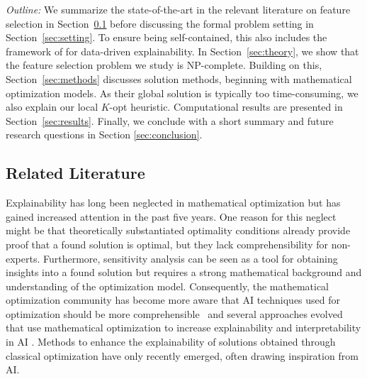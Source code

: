 \documentclass[11pt, a4paper]{article}
\newcommand{\MGil}[1]{\todo[color=gray, textcolor=black, inline, author=MG]{#1}}
\begin{document}
\emph{Outline:} We summarize the state-of-the-art in the
relevant literature on feature selection in
Section~\ref{sec:literature} before discussing the formal problem setting in Section~\ref{sec:setting}.
To ensure being self-contained, this also includes the framework of \cite{aigner2024framework} for data-driven explainability. In Section~\ref{sec:theory}, we show that the feature selection problem we study is NP-complete. Building on this, Section~\ref{sec:methods} discusses solution methods, beginning with
mathematical optimization models. As their global solution is typically too time-consuming, we also explain our local $K$-opt heuristic. 
Computational results are presented in
Section~\ref{sec:results}. Finally, we conclude with a short summary and future research
questions in Section \ref{sec:conclusion}. 


\subsection{Related Literature}\label{sec:literature}

Explainability has long been neglected in mathematical optimization but has gained increased attention in the past five years. One reason for this neglect might be that theoretically substantiated optimality conditions already provide proof that a found solution is optimal, but they lack comprehensibility for non-experts. Furthermore, sensitivity analysis can be seen as a tool for obtaining insights into a found solution but requires a strong mathematical background and understanding of the optimization model.
Consequently, the mathematical optimization community has become more aware that AI techniques used for optimization should be more comprehensible~\citep{EJOR_Special_Issue,de2023explainable} and several approaches evolved that use mathematical optimization  to increase explainability and interpretability in AI \citep{Aghaei_Azizi_Vayanos_2019,carrizosa2024mathematical}.
Methods to enhance the explainability of solutions obtained through classical optimization have only recently emerged, often drawing inspiration from AI.
\end{document}
